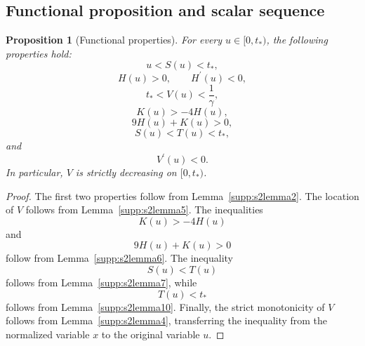 \documentclass[11pt,a4paper]{article}
\numberwithin{equation}{section}
\numberwithin{table}{section}
\theoremstyle{plain}
\newtheorem{proposition}[theorem]{Proposition}
\theoremstyle{definition}\newtheorem{definition}[theorem]{Definition}
\theoremstyle{remark}\newtheorem{remark}[theorem]{Remark}
\begin{document}
\subsection{Functional proposition and scalar sequence}

\begin{proposition}[Functional properties]\label{supp:s2functional}
For every $u\in[0,t_*)$, the following properties hold: 
\begin{equation*}
u<S(u)<t_*,
\end{equation*}
\begin{equation*}
H(u)>0, \qquad H^{\prime}(u)<0,
\end{equation*}
\begin{equation*}
t_*<V(u)<\frac1\gamma,
\end{equation*}
\begin{equation*}
K(u)>-4H(u),
\end{equation*}
\begin{equation*}
9H(u)+K(u)>0,
\end{equation*}
\begin{equation*}
S(u)<T(u)<t_*,
\end{equation*}
and 
\begin{equation*}
V^{\prime}(u)<0.
\end{equation*}
In particular, $V$ is strictly decreasing on $[0,t_*)$.
\end{proposition}

\begin{proof}
The first two properties follow from Lemma~\ref{supp:s2lemma2}.
The location of $V$ follows from Lemma~\ref{supp:s2lemma5}.
The inequalities 
\begin{equation*}
K(u)>-4H(u)
\end{equation*}
and 
\begin{equation*}
9H(u)+K(u)>0
\end{equation*}
follow from Lemma~\ref{supp:s2lemma6}. The inequality 
\begin{equation*}
S(u)<T(u)
\end{equation*}
follows from Lemma~\ref{supp:s2lemma7}, while 
\begin{equation*}
T(u)<t_*
\end{equation*}
follows from Lemma~\ref{supp:s2lemma10}. Finally, the strict
monotonicity of $V$ follows from Lemma~\ref{supp:s2lemma4}, transferring
the inequality from the normalized variable $x$ to the original
variable $u$.
\end{proof}
\end{document}
